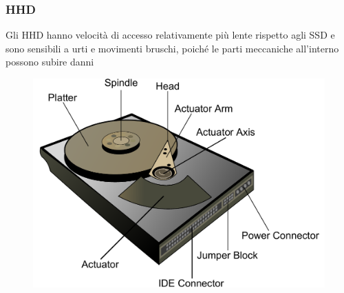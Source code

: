 \begin{frame}
	\frametitle{HHD}
	  
	\begin{block}{}
		 Gli HHD hanno velocità di accesso relativamente più lente rispetto agli SSD e sono sensibili a urti e movimenti bruschi, poiché le parti meccaniche all'interno possono subire danni	 
	\end{block}
	\begin{figure}[!htbp]
		\centering 
		\includegraphics[width=0.65\linewidth]{images/5_memory/hhd_info_1.pdf}
		\label{fig:memory_hdd_info_1}
	\end{figure}
\end{frame}



